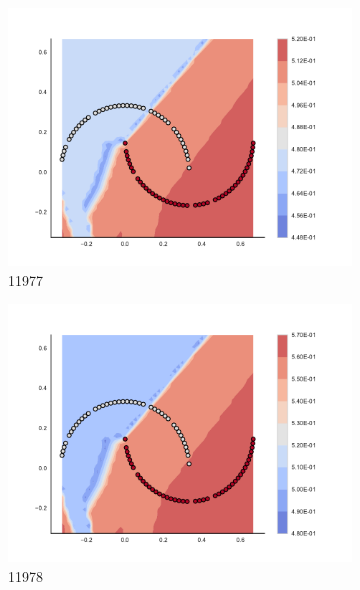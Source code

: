\begin{figure}[h]
\begin{subfigure}[b]{0.09\textwidth}
    \includegraphics[clip, trim=2.35cm 1.75cm 4.5cm 0cm,width=\textwidth]{img/convergence/11977.pdf}
    \caption{11977}
    \label{fig:convergence_11977}
\end{subfigure}
%
\begin{subfigure}[b]{0.09\textwidth}
    \includegraphics[clip, trim=2.35cm 1.75cm 4.5cm 0cm,width=\textwidth]{img/convergence/11978.pdf}
    \caption{11978}
    \label{fig:convergence_11978}
\end{subfigure}
%
\begin{subfigure}[b]{0.09\textwidth}

\end{subfigure}
\end{figure}
